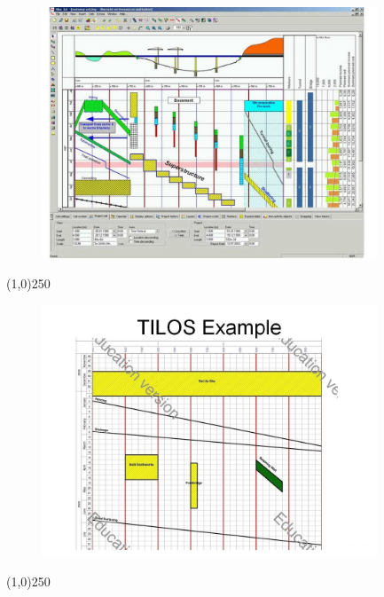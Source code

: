 \begin{frame}
\begin{figure}
	\centering
		\includegraphics[width = 10.0cm]{oldnotes/Slide315.jpg}
\end{figure}
\end{frame}
\begin{center}\line(1,0){250}\end{center}




\begin{frame}
\begin{figure}
	\centering
		\includegraphics[width = 10.0cm]{oldnotes/Slide316.jpg}
\end{figure}
\end{frame}
\begin{center}\line(1,0){250}\end{center}









